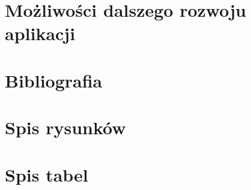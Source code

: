 \documentclass[12pt]{article}
\begin{document}
\begin{sloppypar}
{}

\section{Możliwości dalszego rozwoju aplikacji}
{

}

\section{Bibliografia}
{
  \printbibliography
}

\section{Spis rysunków}
{
  \listoffigures
}

\section{Spis tabel}
{
  \listoftables
}

\end{sloppypar}
\end{document}
